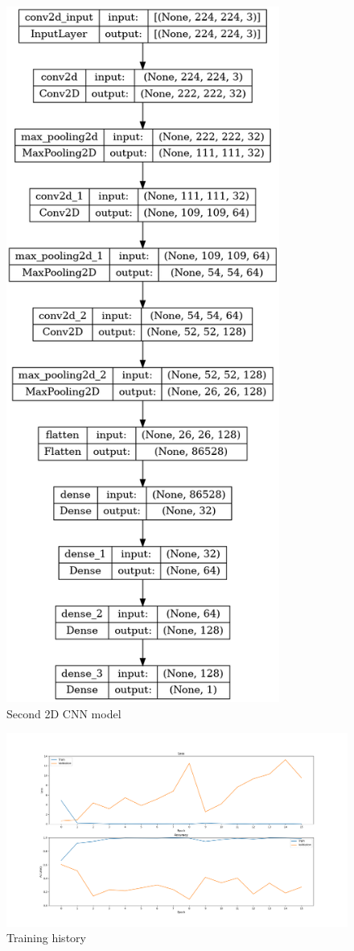 \begin{figure}[H]
    \centering
    \includegraphics[width=0.8\textwidth, height=1.3\textwidth]{images/2D_35_noDrop.png}
    \caption{Second 2D CNN model}
    \label{fig:Second2DCNN}
\end{figure}


\begin{figure}[H]
    \centering
    \includegraphics[width=1\textwidth]{images/731a-2D35-86ad-history.png}
    \caption{Training history}
    \label{fig:Second2DCNNHistory}
\end{figure}


